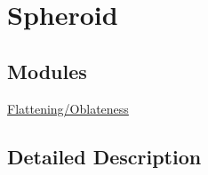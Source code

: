 \hypertarget{group___e_g_x_math-_geometry-3_d-_spheroid}{}\section{Spheroid}
\label{group___e_g_x_math-_geometry-3_d-_spheroid}
\subsection*{Modules}
\begin{DoxyCompactItemize}
\item 
\mbox{\hyperlink{group___e_g_x_math-_geometry-3_d-_spheroid-_flattening}{Flattening/\+Oblateness}}
\end{DoxyCompactItemize}


\subsection{Detailed Description}
